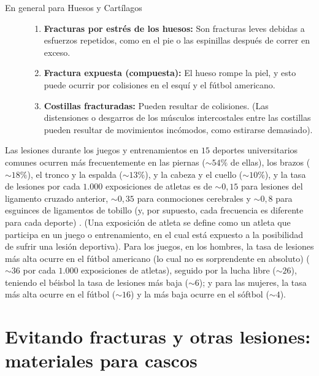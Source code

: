 \documentclass[12pt]{book}
\begin{document}
\begin{description}
  \item[En general para Huesos y Cartílagos] \hfill
  \begin{enumerate}
    \item \textbf{Fracturas por estrés de los huesos:} Son fracturas leves debidas a esfuerzos repetidos, como en el pie o las espinillas después de correr en exceso.
    \item \textbf{Fractura expuesta (compuesta):} El hueso rompe la piel, y esto puede ocurrir por colisiones en el esquí y el fútbol americano.
    \item \textbf{Costillas fracturadas:} Pueden resultar de colisiones. (Las distensiones o desgarros de los músculos intercostales entre las costillas pueden resultar de movimientos incómodos, como estirarse demasiado).
  \end{enumerate}
\end{description}

Las lesiones durante los juegos y entrenamientos en $15$ deportes universitarios comunes ocurren más frecuentemente en las piernas ($\sim 54\%$ de ellas), los brazos ($\sim 18\%$), el tronco y la espalda ($\sim 13\%$), y la cabeza y el cuello ($\sim 10\%$), y la tasa de lesiones por cada $1.000$ exposiciones de atletas es de $\sim 0,15$ para lesiones del ligamento cruzado anterior, $\sim 0,35$ para conmociones cerebrales y $\sim 0,8$ para esguinces de ligamentos de tobillo (y, por supuesto, cada frecuencia es diferente para cada deporte) \cite{33}. (Una exposición de atleta se define como un atleta que participa en un juego o entrenamiento, en el cual está expuesto a la posibilidad de sufrir una lesión deportiva). Para los juegos, en los hombres, la tasa de lesiones más alta ocurre en el fútbol americano (lo cual no es sorprendente en absoluto) ($\sim 36$ por cada $1.000$ exposiciones de atletas), seguido por la lucha libre ($\sim 26$), teniendo el béisbol la tasa de lesiones más baja ($\sim 6$); y para las mujeres, la tasa más alta ocurre en el fútbol ($\sim 16$) y la más baja ocurre en el sóftbol ($\sim 4$).

\section{Evitando fracturas y otras lesiones: materiales para cascos}
\end{document}
